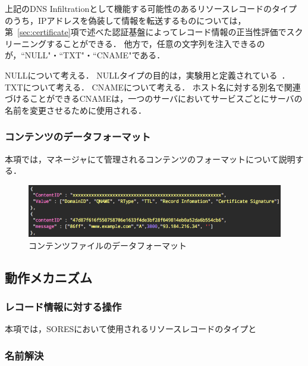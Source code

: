 上記のDNS Infiltrationとして機能する可能性のあるリソースレコードのタイプのうち，IPアドレスを偽装して情報を転送するものについては，第~\ref{sec:certificate}項で述べた認証基盤によってレコード情報の正当性評価でスクリーニングすることができる．
他方で，任意の文字列を注入できるのが，``NULL"・``TXT"・``CNAME"である．

NULLについて考える．
NULLタイプの目的は，実験用と定義されている~\cite{rfc1035}．
TXTについて考える．
CNAMEについて考える．
ホスト名に対する別名で関連づけることができるCNAMEは，一つのサーバにおいてサービスごとにサーバの名前を変更させるために使用される．


\subsubsection{コンテンツのデータフォーマット}
本項では，マネージャにて管理されるコンテンツのフォーマットについて説明する．

\begin{figure}[h]
 \centering
 \includegraphics[scale=0.5]{figure/content-file.png}
 \caption{コンテンツファイルのデータフォーマット}
 \label{fig:manager-provider}
\end{figure}

\subsection{動作メカニズム}
\subsubsection{レコード情報に対する操作}
本項では，SORESにおいて使用されるリソースレコードのタイプと

\subsubsection{名前解決}
